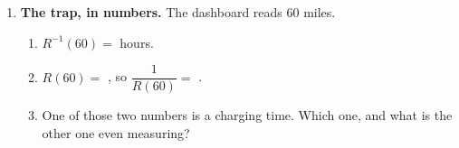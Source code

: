 \documentclass[10pt]{article}
\begin{document}
\begin{tcolorbox}[colback=white, colframe=black!40,
    title=\textbf{Tier A --- Approaching Proficiency},
    fonttitle=\bfseries, arc=2mm, left=3mm, right=3mm, top=2mm, bottom=2mm]
\begin{enumerate}[itemsep=8pt]
        Both came out to \blank{1.2cm}, which is the \blank{2.4cm} function.

  \item \textbf{The trap, in numbers.} The dashboard reads 60 miles.

        \begin{enumerate}[label=(\alph*), itemsep=4pt]
          \item $R^{-1}(60) = $ \blank{1.6cm} hours.
          \item $R(60) = $ \blank{1.6cm}, so $\dfrac{1}{R(60)} = $
                \blank{1.8cm}.
          \item One of those two numbers is a charging time. Which one, and
                what is the other one even measuring?

                \vspace{0.05in}
                \writeline
        \end{enumerate}
\end{enumerate}
\end{tcolorbox}

\vspace{0.1in}
\end{document}
